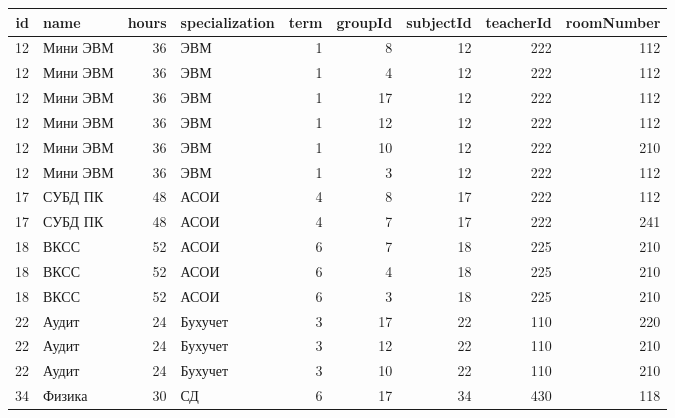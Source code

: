 \begin{tabular}{rlrlrrrrr}
\toprule
id & name & hours & specialization & term & groupId & subjectId & teacherId & roomNumber \\
\midrule
12 & Мини ЭВМ & 36 & ЭВМ & 1 & 8 & 12 & 222 & 112 \\
12 & Мини ЭВМ & 36 & ЭВМ & 1 & 4 & 12 & 222 & 112 \\
12 & Мини ЭВМ & 36 & ЭВМ & 1 & 17 & 12 & 222 & 112 \\
12 & Мини ЭВМ & 36 & ЭВМ & 1 & 12 & 12 & 222 & 112 \\
12 & Мини ЭВМ & 36 & ЭВМ & 1 & 10 & 12 & 222 & 210 \\
12 & Мини ЭВМ & 36 & ЭВМ & 1 & 3 & 12 & 222 & 112 \\
17 & СУБД ПК & 48 & АСОИ & 4 & 8 & 17 & 222 & 112 \\
17 & СУБД ПК & 48 & АСОИ & 4 & 7 & 17 & 222 & 241 \\
18 & ВКСС & 52 & АСОИ & 6 & 7 & 18 & 225 & 210 \\
18 & ВКСС & 52 & АСОИ & 6 & 4 & 18 & 225 & 210 \\
18 & ВКСС & 52 & АСОИ & 6 & 3 & 18 & 225 & 210 \\
22 & Аудит & 24 & Бухучет & 3 & 17 & 22 & 110 & 220 \\
22 & Аудит & 24 & Бухучет & 3 & 12 & 22 & 110 & 210 \\
22 & Аудит & 24 & Бухучет & 3 & 10 & 22 & 110 & 210 \\
34 & Физика & 30 & СД & 6 & 17 & 34 & 430 & 118 \\
\bottomrule
\end{tabular}
